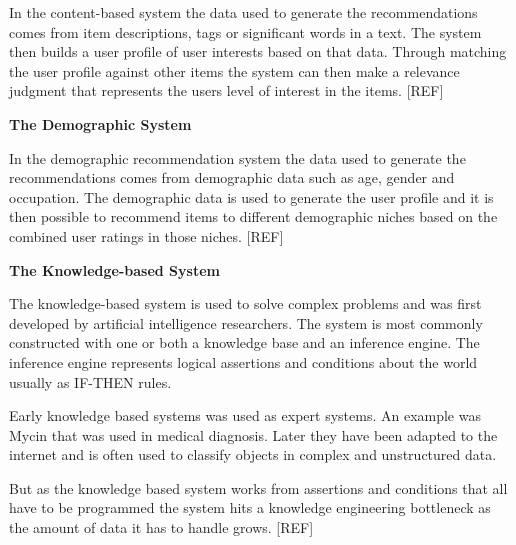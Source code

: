 In the content-based system the data used to generate the recommendations comes from item descriptions, tags or significant words in a text. The system then builds a user profile of user interests based on that data. Through matching the user profile against other items the system can then make a relevance judgment that represents the users level of interest in the items. [REF]

\textbf{The Demographic System}

In the demographic recommendation system the data used to generate the recommendations comes from demographic data such as age, gender and occupation. The demographic data is used to generate the user profile and it is then possible to recommend items to different demographic niches based on the combined user ratings in those niches. [REF]

\textbf{The Knowledge-based System}

The knowledge-based system is used to solve complex problems and was first developed by artificial intelligence researchers. The system is most commonly constructed with one or both a knowledge base  and an inference engine. The inference engine represents logical assertions and conditions about the world usually as IF-THEN rules.

Early knowledge based systems was used as expert systems. An example was Mycin that was used in medical diagnosis. Later they have been adapted to the internet and is often used to classify objects in complex and unstructured data.

But as the knowledge based system works from assertions and conditions that all have to be programmed the system hits a knowledge engineering bottleneck as the amount of data it has to handle grows. [REF]
